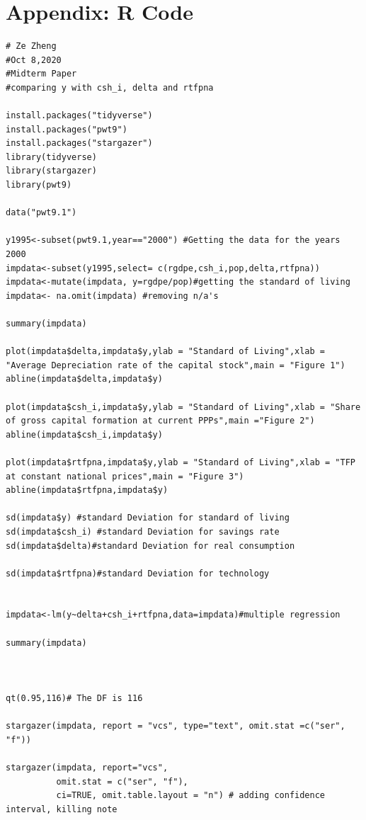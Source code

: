 \documentclass{article}
\begin{document}
\section{Appendix: R Code}
\begin{verbatim}
# Ze Zheng
#Oct 8,2020
#Midterm Paper
#comparing y with csh_i, delta and rtfpna

install.packages("tidyverse")
install.packages("pwt9")
install.packages("stargazer")
library(tidyverse)
library(stargazer)
library(pwt9)

data("pwt9.1")

y1995<-subset(pwt9.1,year=="2000") #Getting the data for the years 2000
impdata<-subset(y1995,select= c(rgdpe,csh_i,pop,delta,rtfpna))
impdata<-mutate(impdata, y=rgdpe/pop)#getting the standard of living
impdata<- na.omit(impdata) #removing n/a's

summary(impdata)

plot(impdata$delta,impdata$y,ylab = "Standard of Living",xlab = "Average Depreciation rate of the capital stock",main = "Figure 1")
abline(impdata$delta,impdata$y)

plot(impdata$csh_i,impdata$y,ylab = "Standard of Living",xlab = "Share of gross capital formation at current PPPs",main ="Figure 2")
abline(impdata$csh_i,impdata$y)

plot(impdata$rtfpna,impdata$y,ylab = "Standard of Living",xlab = "TFP at constant national prices",main = "Figure 3")
abline(impdata$rtfpna,impdata$y)

sd(impdata$y) #standard Deviation for standard of living
sd(impdata$csh_i) #standard Deviation for savings rate
sd(impdata$delta)#standard Deviation for real consumption

sd(impdata$rtfpna)#standard Deviation for technology


impdata<-lm(y~delta+csh_i+rtfpna,data=impdata)#multiple regression

summary(impdata)



qt(0.95,116)# The DF is 116  

stargazer(impdata, report = "vcs", type="text", omit.stat =c("ser", "f"))

stargazer(impdata, report="vcs", 
          omit.stat = c("ser", "f"),
          ci=TRUE, omit.table.layout = "n") # adding confidence interval, killing note


\end{verbatim}
\end{document}
